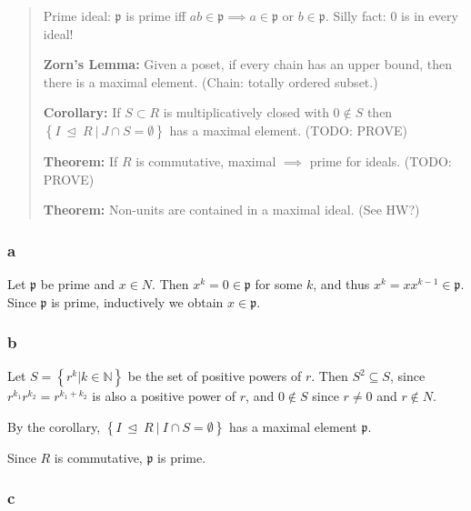 \begin{solution}

\begin{quote}
Prime ideal: \(\mathfrak{p}\) is prime iff
\(ab \in \mathfrak{p} \implies a\in \mathfrak{p}\) or
\(b\in \mathfrak{p}\). Silly fact: 0 is in every ideal!

\textbf{Zorn's Lemma:} Given a poset, if every chain has an upper bound,
then there is a maximal element. (Chain: totally ordered subset.)

\textbf{Corollary:} If \(S\subset R\) is multiplicatively closed with
\(0\not\in S\) then
\(\left\{{I {~\trianglelefteq~}R {~\mathrel{\Big|}~}J\cap S = \emptyset}\right\}\)
has a maximal element. (TODO: PROVE)

\textbf{Theorem:} If \(R\) is commutative, maximal \(\implies\) prime
for ideals. (TODO: PROVE)

\textbf{Theorem:} Non-units are contained in a maximal ideal. (See HW?)
\end{quote}

\hypertarget{a-34}{%
\subsubsection{a}\label{a-34}}

Let \(\mathfrak{p}\) be prime and \(x\in N\). Then
\(x^k = 0 \in \mathfrak{p}\) for some \(k\), and thus
\(x^k = x x^{k-1} \in \mathfrak p\). Since \(\mathfrak p\) is prime,
inductively we obtain \(x\in\mathfrak p\).

\hypertarget{b-24}{%
\subsubsection{b}\label{b-24}}

Let \(S = \left\{{r^k \mathrel{\Big|}k\in {\mathbb{N}}}\right\}\) be the
set of positive powers of \(r\). Then \(S^2 \subseteq S\), since
\(r^{k_1}r^{k_2} = r^{k_1+k_2}\) is also a positive power of \(r\), and
\(0\not\in S\) since \(r\neq 0\) and \(r\not\in N\).

By the corollary,
\(\left\{{I {~\trianglelefteq~}R {~\mathrel{\Big|}~}I\cap S = \emptyset}\right\}\)
has a maximal element \(\mathfrak{p}\).

Since \(R\) is commutative, \(\mathfrak{p}\) is prime.

\hypertarget{c-17}{%
\subsubsection{c}\label{c-17}}


\end{solution}
